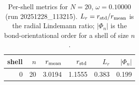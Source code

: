 \begin{table}[t]
\centering
\small
\setlength{\tabcolsep}{4pt}
\renewcommand{\arraystretch}{1.15}
\begin{tabular}{r r r r r r}
\toprule
shell & $n$ & $r_{\rm mean}$ & $r_{\rm std}$ & $L_r$ & $|\Phi_n|$ \\
\midrule
0 & 20 & 3.0194 & 1.1555 & 0.383 & 0.199 \\
\bottomrule
\end{tabular}
\caption{Per-shell metrics for $N=20$, $\omega=0.10000$ (run 20251228_113215). $L_r=r_{\rm std}/r_{\rm mean}$ is the radial Lindemann ratio; $|\Phi_n|$ is the bond-orientational order for a shell of size $n$.}
\end{table}
